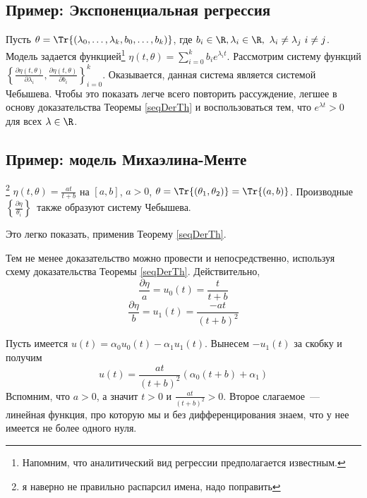 \subsection{Пример: Экспоненциальная регрессия}
Пусть $\theta = \Tr{(\lambda_0, \ldots, \lambda_k, b_0, \ldots, b_k)}$, где $b_i \in \R, \lambda_i \in \R, \lambda_i \neq \lambda_j i \neq j$.
Модель задается функцией\footnote{Напомним, что аналитический вид регрессии предполагается известным.} 
$\eta(t, \theta) = \sum\limits_{i=0}^k b_i e^{\lambda_it}$.
Рассмотрим систему функций 
$\left\{ \frac{\partial \eta(t, \theta)}{\partial \lambda_i}, \frac{\partial \eta(t, \theta)}{\partial b_i} \right\}_{i=0}^{k}$.
Оказывается, данная система является системой Чебышева.
Чтобы это показать легче всего повторить рассуждение, легшее в основу доказательства Теоремы \eqref{seqDerTh} и воспользоваться тем, что $e^{\lambda t} > 0$ для всех $\lambda \in \R$.

\subsection{Пример: модель Михаэлина-Менте}\footnote{я наверно не правильно распарсил имена, надо поправить}
$\eta(t, \theta) = \frac{at}{t+b}$ на $[a, b]$, $a > 0$, $\theta = \Tr{(\theta_1, \theta_2)} = \Tr{(a, b)}$.
Производные $\left\{\frac{\partial\eta}{\theta_i}\right\}$ также образуют систему Чебышева. 

Это легко показать, применив Теорему \eqref{seqDerTh}.

{\footnotesize Тем не менее доказательство можно провести и непосредственно, используя схему доказательства Теоремы \eqref{seqDerTh}.
Действительно,
$$\frac{\partial\eta}{a} = u_0(t) = \frac{t}{t+b}$$
$$ \frac{\partial\eta}{b} = u_1(t) = \frac{-at}{(t+b)^2}$$

Пусть имеется $u(t) = \alpha_0 u_0(t) - \alpha_1u_1(t)$. Вынесем $-u_1(t)$ за скобку и получим
$$u(t) = \frac{at}{(t+b)^2}\left( \alpha_0 (t+b) + \alpha_1  \right)$$
Вспомним, что $a >0$, а значит $t > 0$ и $\frac{at}{(t+b)^2} > 0$. Второе слагаемое — линейная функция, про которую мы и без дифференцирования знаем, что у нее имеется не более одного нуля.}
